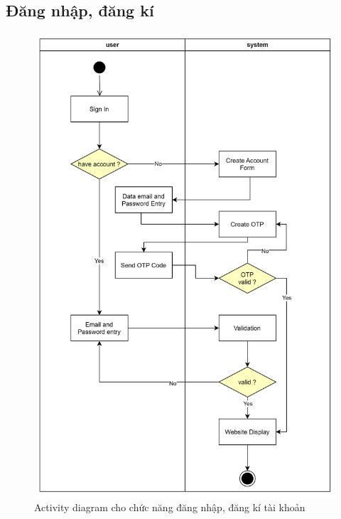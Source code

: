 \subsection{Đăng nhập, đăng kí}
\begin{figure}[h]
    \centering
    \includegraphics[scale = 0.13]{img/activity/signin.png}
    \vspace{1cm}
    \caption{Activity diagram cho chức năng đăng nhập, đăng kí tài khoản}
    \label{fig:taskAssignment}
\end{figure}

\newpage
